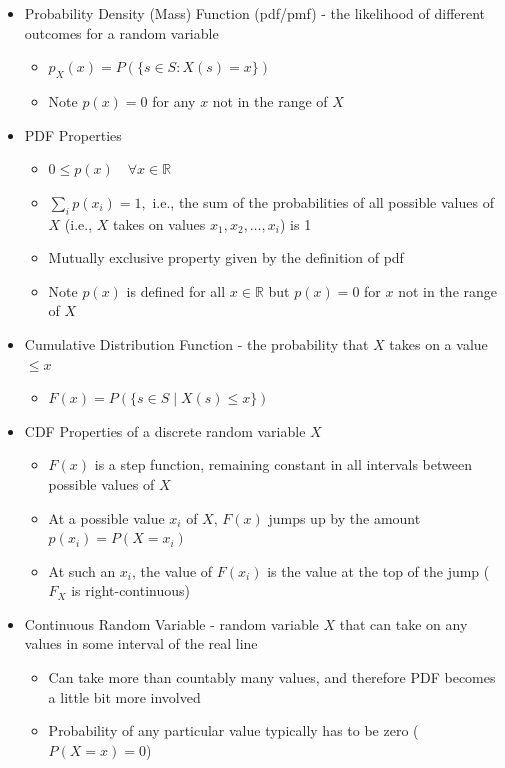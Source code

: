\documentclass{article}
\begin{document}
\begin{itemize}
    \item Probability Density (Mass) Function (pdf/pmf) - the likelihood of different outcomes for a random variable
    \begin{itemize}
        \item  $p_X(x)=P(\{s \in S: X(s) = x\})$
        \item Note $p(x)=0$ for any $x$ not in the range of $X$
    \end{itemize}
    \item PDF Properties
    \begin{itemize}
        \item $0 \le p(x) \quad \forall x \in \mathbb{R}$
        \item $\sum_i p(x_i)=1,$ i.e., the sum of the probabilities of all possible values of $X$ (i.e., $X$ takes on values $x_1,x_2, \dots ,x_i$) is 1
        \item Mutually exclusive property given by the definition of pdf
        \item Note $p(x)$ is defined for all $x \in \mathbb{R}$ but $p(x)=0$ for $x$ not in the range of $X$
    \end{itemize}
    \item Cumulative Distribution Function - the probability that $X$ takes on a value $\le x$
    \begin{itemize}
        \item $F(x)=P(\{s \in S \mid X(s) \le x\})$
    \end{itemize}
    \item CDF Properties of a discrete random variable $X$
    \begin{itemize}
        \item $F(x)$ is a step function, remaining constant in all intervals between possible values of $X$
        \item At a possible value $x_i$ of $X$, $F(x)$ jumps up by the amount $p(x_i)=P(X=x_i)$
        \item At such an $x_i$, the value of $F(x_i)$ is the value at the top of the jump ($F_X$ is right-continuous)
    \end{itemize}
    \item Continuous Random Variable - random variable $X$ that can take on any values in some interval of the real line
    \begin{itemize}
        \item Can take more than countably many values, and therefore PDF becomes a little bit more involved
        \item Probability of any particular value typically has to be zero ($P(X=x)=0$)

\end{itemize}
\end{itemize}
\end{document}
